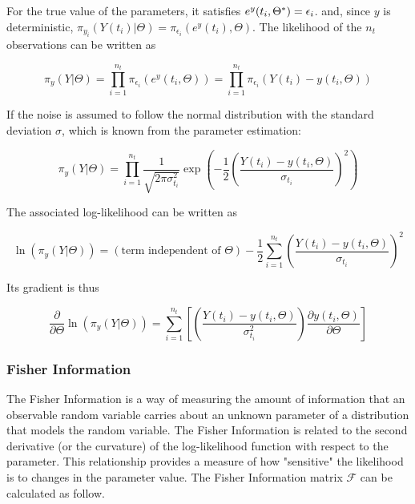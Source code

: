 \documentclass[../Article_Design_of_Experiment.tex]{subfiles}
\begin{document}
	For the true value of the parameters, it satisfies $e^y(t_i, \Theta^*)\\=\epsilon_i$. and, since $y$ is deterministic, $\pi_{y_i} (Y(t_i)|\Theta) = \pi_{\epsilon_i} (e^y(t_i),\Theta)$. The likelihood of the $n_t$ observations can be written as
	
	{\footnotesize
	\begin{equation}
		\pi_y (Y|\Theta) = \prod_{i=1}^{n_t} \pi_{\epsilon_i}(e^y(t_i,\Theta)) =  \prod_{i=1}^{n_t} \pi_{\epsilon_i}(Y(t_i) - y(t_i, \Theta))
	\end{equation} }
	
	If the noise is assumed to follow the normal distribution with the standard deviation $\sigma$, which is known from the parameter estimation:
	
	{\footnotesize
	\begin{equation}
		\pi_y (Y|\Theta) = \prod_{i=1}^{n_t} \frac{1}{ \sqrt{2\pi\sigma_{t_i}^2} } \exp \left( -\frac{1}{2} \left( \frac{Y(t_i) - y(t_i, \Theta)}{\sigma_{t_i}} \right)^2 \right)
	\end{equation} }
	
	The associated log-likelihood can be written as
	
	{\footnotesize
	\begin{equation}
		\ln (\pi_y (Y|\Theta)) = (\text{term independent of } \Theta) - \frac{1}{2} \sum_{i=1}^{n_t}  \left( \frac{Y(t_i) - y(t_i, \Theta)}{\sigma_{t_i}} \right)^2
	\end{equation} }
	
	Its gradient is thus
	
	{\footnotesize
	\begin{equation}
		\frac{\partial}{\partial \Theta} \ln (\pi_y (Y|\Theta)) =  \sum_{i=1}^{n_t}  \left[ \left( \frac{Y(t_i) - y(t_i, \Theta)}{\sigma_{t_i}^2} \right) \frac{\partial y(t_i, \Theta)}{\partial \Theta} \right]
	\end{equation} }
	
	\subsubsection{Fisher Information}
	
	The Fisher Information is a way of measuring the amount of information that an observable random variable carries about an unknown parameter of a distribution that models the random variable. The Fisher Information is related to the second derivative (or the curvature) of the log-likelihood function with respect to the parameter. This relationship provides a measure of how "sensitive" the likelihood is to changes in the parameter value. The Fisher Information matrix $\mathcal{F}$ can be calculated as follow.
	
\end{document}
